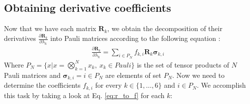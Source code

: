 \documentclass{aux/ttuthes2007}
\newcommand{\fpd}[2]{\frac{\partial #1}{\partial #2}}
\newcommand{\elec}{N}
\begin{document}
\subsection {\textbf{Obtaining derivative coefficients}}
%
Now that we have each matrix $\bm R_k$, we obtain the decomposition of their derivatives $\fpd{\bm R_k}{\lambda_k}$ into Pauli matrices according to the following equation \cite{benjamin}:
%
\begin{equation}\label{eq:r_to_f}
\begin{split}
	\fpd{\bm R_k}{\lambda_k} = \sum_{i \in P_\elec} f_{k, i} \bm R_k \bm \sigma_{k, i}
\end{split}
\end{equation}
%
Where $P_\elec = \{x \vert x = \bigotimes_{k = 1}^{\elec} x_k,\ x_k \in Pauli\}$ is the set of tensor products of $\elec$ Pauli matrices and $ \bm \sigma_{k, i} = i \in P_\elec$ are elements of set $P_\elec$.
Now we need to determine the coefficients $f_{k, i}$ for every $k \in \{1, \ldots, 6\}$ and $i \in P_\elec$. We accomplish this task by taking a look at Eq. \ref{eq:r_to_f} for each $k$:
%
\end{document}

